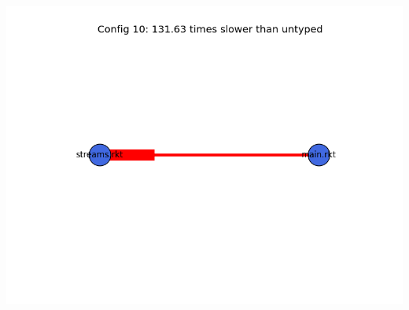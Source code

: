 \documentclass{article}
\begin{document}
\begin{itemize}
\includegraphics[width=\textwidth]{sieve-2015-04-06-module-graph-10.png}
\end{itemize}
\end{document}

